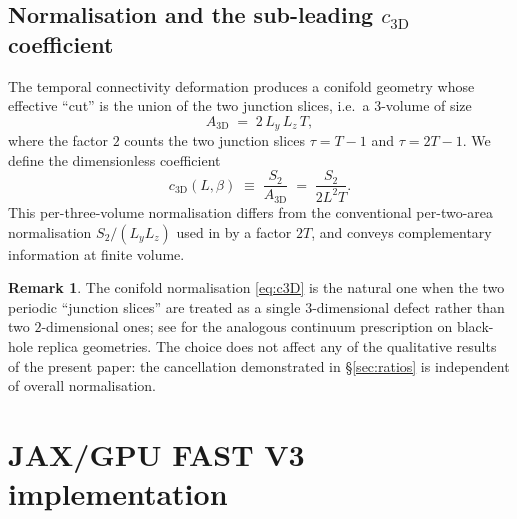 \documentclass[11pt,a4paper]{article}
\theoremstyle{definition}
\newtheorem{remark}[theorem]{Remark}
\newcommand{\threeD}{{3\text{D}}}
\begin{document}
\subsection{Normalisation and the sub-leading $c_{\threeD}$ coefficient}
\label{sec:normalisation}

The temporal connectivity deformation produces a conifold geometry
whose effective ``cut'' is the union of the two junction slices,
i.e.\ a $3$-volume of size
\begin{equation}
   A_{\threeD} \;=\; 2\,L_{y}\,L_{z}\,T,
   \label{eq:A3D}
\end{equation}
where the factor $2$ counts the two junction slices $\tau = T - 1$
and $\tau = 2T - 1$. We define the dimensionless coefficient
\begin{equation}
   c_{\threeD}(L,\beta) \;\equiv\; \frac{S_{2}}{A_{\threeD}}
                              \;=\; \frac{S_{2}}{2L^{2}T}.
   \label{eq:c3D}
\end{equation}
This per-three-volume normalisation differs from the conventional
per-two-area normalisation $S_{2}/(L_{y}L_{z})$ used in
\cite{Rabenstein2019} by a factor $2T$, and conveys complementary
information at finite volume.

\begin{remark}
The conifold normalisation \eqref{eq:c3D} is the natural one when the
two periodic ``junction slices'' are treated as a single
$3$-dimensional defect rather than two $2$-dimensional ones; see
\cite{Solodukhin2011} for the analogous continuum prescription on
black-hole replica geometries. The choice does not affect any of the
qualitative results of the present paper: the cancellation
demonstrated in \S\ref{sec:ratios} is independent of overall
normalisation.
\end{remark}


\section{JAX/GPU FAST V3 implementation}
\label{sec:impl}
\end{document}

